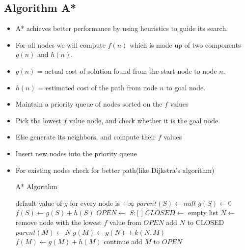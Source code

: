 \documentclass[a4paper]{article}
\begin{document}
\subsection{Algorithm A*}
\begin{itemize}
    \item A* achieves better performance by using heuristics to guide its search.
    \item For all nodes we will compute $f(n)$ which is made up of two components $g(n)$ and $h(n)$.
    \item $g(n)$ = actual cost of solution found from the start node to node $n$.
    \item $h(n)$ = estimated cost of the path from node $n$ to goal node.
    \item Maintain a priority queue of nodes sorted on the $f$ values
    \item Pick the lowest $f$ value node, and check whether it is the goal node.
    \item Else generate its neighbors, and compute their $f$ values
    \item Insert new nodes into the priority queue
    \item For existing nodes check for better path(like Dijkstra's algorithm)
    \begin{algorithm}[H]
        \caption{A* Algorithm}\label{alg:AI-A*}
        \begin{algorithmic}[1]
            \Statex {}
            \State default value of $g$ for every node is $+\infty$
            \State $parent(S)\gets null$
            \State $g(S)\gets 0$
            \State $f(S)\gets g(S)+h(S)$
            \State $OPEN\gets$ $S:$[ ]
            \State $CLOSED\gets$ empty list
                \State $N\gets$ remove node with the lowest $f$ value from $OPEN$
                \State add $N$ to CLOSED
                    \State \Return {}
                \EndIf
                        \State $parent(M)\gets N$
                        \State $g(M)\gets g(N)+k(N,M)$
                        \State $f(M)\gets g(M)+h(M)$
                            \State continue 
                        \EndIf
                            \State {}
                        \Else 
                            \State add $M$ to $OPEN$ 

\end{algorithmic}
\end{algorithm}
\end{itemize}
\end{document}
